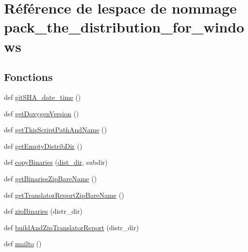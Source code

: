 \hypertarget{namespacepack__the__distribution__for__windows}{}\section{Référence de l\textquotesingle{}espace de nommage pack\+\_\+the\+\_\+distribution\+\_\+for\+\_\+windows}
\label{namespacepack__the__distribution__for__windows}
\subsection*{Fonctions}
\begin{DoxyCompactItemize}
\item 
def \hyperlink{namespacepack__the__distribution__for__windows_aa5f5320740552dd8d77a25b12cf1aafd}{git\+S\+H\+A\+\_\+date\+\_\+time} ()
\item 
def \hyperlink{namespacepack__the__distribution__for__windows_ae88fc4f5922b82b3a4f9ffbd56756d4c}{get\+Doxygen\+Version} ()
\item 
def \hyperlink{namespacepack__the__distribution__for__windows_aac425f8a463d9644306911bb97deb270}{get\+This\+Script\+Path\+And\+Name} ()
\item 
def \hyperlink{namespacepack__the__distribution__for__windows_affd67a5cdeba88b96fccdf8939763310}{get\+Empty\+Distrib\+Dir} ()
\item 
def \hyperlink{namespacepack__the__distribution__for__windows_aed73945d5881d397fe82cd9c051dd3e1}{copy\+Binaries} (\hyperlink{namespacepack__the__distribution__for__windows_a3a7f0078845cd979c4e85e047ede18b4}{dist\+\_\+dir}, subdir)
\item 
def \hyperlink{namespacepack__the__distribution__for__windows_a5657304e54610664b7f0158fc119c920}{get\+Binaries\+Zip\+Bare\+Name} ()
\item 
def \hyperlink{namespacepack__the__distribution__for__windows_a10bee65c322b212f2538cbfdef3750de}{get\+Translator\+Report\+Zip\+Bare\+Name} ()
\item 
def \hyperlink{namespacepack__the__distribution__for__windows_a31d8a14f9ecf4898efccc9affef03671}{zip\+Binaries} (distr\+\_\+dir)
\item 
def \hyperlink{namespacepack__the__distribution__for__windows_a5211bf38c16f6bb6c023c2a7848841c8}{build\+And\+Zip\+Translator\+Report} (distr\+\_\+dir)
\item 
def \hyperlink{namespacepack__the__distribution__for__windows_a1e059e9f6a7e5bc906fb9760c83cc566}{mailto} ()
\end{DoxyCompactItemize}

